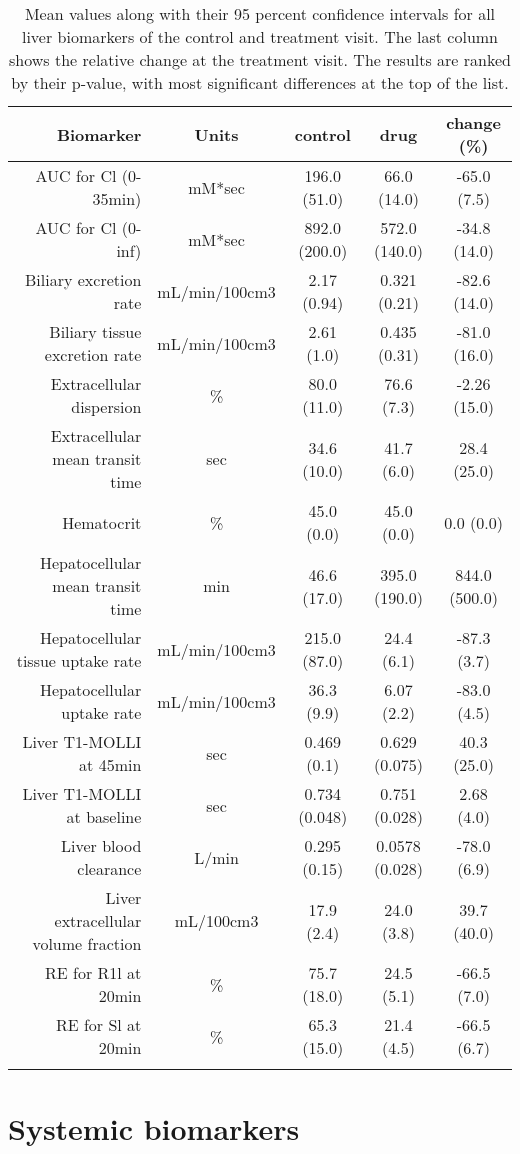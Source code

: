 \documentclass{epflreport}%
\begin{document}
\begin{longtable}{rcccc}%
\hline%
Biomarker&Units&control&drug&change (\%)\\%
\hline%
AUC for Cl (0{-}35min)&mM*sec&196.0 (51.0) &66.0 (14.0) &{-}65.0 (7.5) \\%
AUC for Cl (0{-}inf)&mM*sec&892.0 (200.0) &572.0 (140.0) &{-}34.8 (14.0) \\%
Biliary excretion rate&mL/min/100cm3&2.17 (0.94) &0.321 (0.21) &{-}82.6 (14.0) \\%
Biliary tissue excretion rate&mL/min/100cm3&2.61 (1.0) &0.435 (0.31) &{-}81.0 (16.0) \\%
Extracellular dispersion&\%&80.0 (11.0) &76.6 (7.3) &{-}2.26 (15.0) \\%
Extracellular mean transit time&sec&34.6 (10.0) &41.7 (6.0) &28.4 (25.0) \\%
Hematocrit&\%&45.0 (0.0) &45.0 (0.0) &0.0 (0.0) \\%
Hepatocellular mean transit time&min&46.6 (17.0) &395.0 (190.0) &844.0 (500.0) \\%
Hepatocellular tissue uptake rate&mL/min/100cm3&215.0 (87.0) &24.4 (6.1) &{-}87.3 (3.7) \\%
Hepatocellular uptake rate&mL/min/100cm3&36.3 (9.9) &6.07 (2.2) &{-}83.0 (4.5) \\%
Liver T1{-}MOLLI at 45min&sec&0.469 (0.1) &0.629 (0.075) &40.3 (25.0) \\%
Liver T1{-}MOLLI at baseline&sec&0.734 (0.048) &0.751 (0.028) &2.68 (4.0) \\%
Liver blood clearance&L/min&0.295 (0.15) &0.0578 (0.028) &{-}78.0 (6.9) \\%
Liver extracellular volume fraction&mL/100cm3&17.9 (2.4) &24.0 (3.8) &39.7 (40.0) \\%
RE for R1l at 20min&\%&75.7 (18.0) &24.5 (5.1) &{-}66.5 (7.0) \\%
RE for Sl at 20min&\%&65.3 (15.0) &21.4 (4.5) &{-}66.5 (6.7) \\%
\hline%
\caption{Mean values along with their 95 percent confidence intervals for all liver biomarkers of the control and treatment visit. The last column shows the relative change at the treatment visit. The results are ranked by their p-value, with most significant differences at the top of the list.} \\%
\end{longtable}%
\clearpage%
\section{Systemic biomarkers}%
\label{sec:Systemicbiomarkers}%
\end{document}
